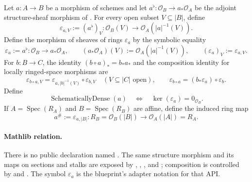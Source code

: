 \begin{definition}
  \label{def:nagata-direct-image-structure-map}

  Let $a\colon A\to B$ be a morphism of schemes and let
  \(a^\flat\colon\mathcal O_B\to a_*\mathcal O_A\) be the adjoint
  structure-sheaf morphism of
  .  For every open subset
  $V\subseteq|B|$, define
  \[
    \varepsilon_{a,V}:=(a^\flat)_V\colon
      \mathcal O_B(V)\longrightarrow
      \mathcal O_A(|a|^{-1}(V)).
  \]
  Define the morphism of sheaves of rings $\varepsilon_a$ by the symbolic
  equality
  \[
    \varepsilon_a:=a^\flat\colon
      \mathcal O_B\longrightarrow a_*\mathcal O_A,
    \qquad
    (a_*\mathcal O_A)(V):=\mathcal O_A(|a|^{-1}(V)),
    \qquad
    (\varepsilon_a)_V:=\varepsilon_{a,V}.
  \]
  For $b\colon B\to C$, the identity $(b\circ a)_*=b_*a_*$ and the
  composition identity for locally ringed-space morphisms are
  \[
    \varepsilon_{b\circ a,V}
      =\varepsilon_{a,|b|^{-1}(V)}\circ\varepsilon_{b,V}
      \quad(V\subseteq|C|\text{ open}),
    \qquad
    \varepsilon_{b\circ a}
      =(b_*\varepsilon_a)\circ\varepsilon_b.
  \]
  Define
  \[
    \operatorname{SchematicallyDense}(a)
      \quad\Longleftrightarrow\quad
    \ker(\varepsilon_a)=0_{\mathcal O_B}.
  \]
  If \(A=\operatorname{Spec}(R_A)\) and
  \(B=\operatorname{Spec}(R_B)\) are affine, define the induced ring map
  \[
    a^\#:=\varepsilon_{a,|B|}\colon
      R_B=\mathcal O_B(|B|)
      \longrightarrow
      \mathcal O_A(|A|)=R_A.                                      \tag{DIM0}
  \]

  \paragraph{Mathlib relation.}
  There is no public declaration named
  \texttt{}.  The same
  structure morphism and its maps on sections and stalks are exposed by
  \texttt{},
  \texttt{},
  \texttt{}, and
  \texttt{}; composition is controlled by
  \texttt{} and
  \texttt{}.  The symbol
  $\varepsilon_a$ is the blueprint's adapter notation for that API.
\end{definition}

